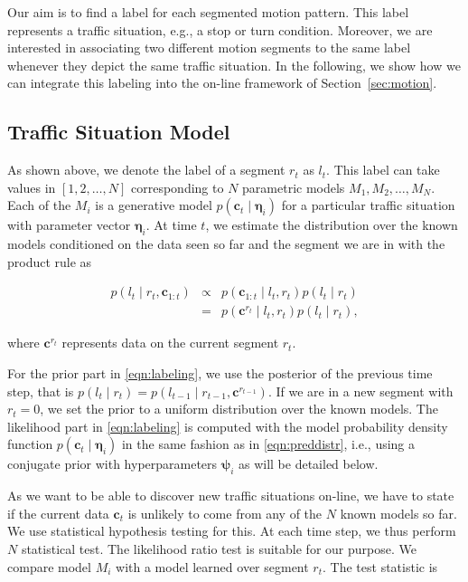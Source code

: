 Our aim is to find a label for each segmented motion pattern. This label
represents a traffic situation, e.g., a stop or turn condition. Moreover, we are
interested in associating two different motion segments to the same label
whenever they depict the same traffic situation. In the following, we show how
we can integrate this labeling into the on-line framework of
Section~\ref{sec:motion}.

\subsection{Traffic Situation Model}
As shown above, we denote the label of a segment $r_t$ as $l_t$. This label can
take values in $[1,2,\dots,N]$ corresponding to $N$ parametric models $M_1,M_2,
\dots,M_N$. Each of the $M_i$ is a generative model $p(\mathbf{c}_t\mid
\boldsymbol{\eta}_i)$ for a particular traffic situation with parameter vector
$\boldsymbol{\eta}_i$. At time $t$, we estimate the distribution over the known
models conditioned on the data seen so far and the segment we are in with the
product rule as

\begin{eqnarray}
\label{eqn:labeling}
p(l_t\mid r_t,\mathbf{c}_{1:t})&\propto&p(\mathbf{c}_{1:t}\mid l_t,r_t)
p(l_t\mid r_t)\nonumber\\
&=& p(\mathbf{c}^{r_t}\mid l_t,r_t)p(l_t\mid r_t),
\end{eqnarray}

where $\mathbf{c}^{r_t}$ represents data on the current segment $r_t$.

For the prior part in \eqref{eqn:labeling}, we use the posterior of the previous
time step, that is
$p(l_t\mid r_t)=p(l_{t-1}\mid r_{t-1},\mathbf{c}^{r_{t-1}})$. If we are in a new
segment with $r_t=0$, we set the prior to a uniform distribution over the known
models. The likelihood part in \eqref{eqn:labeling} is computed with the model
probability density function $p(\mathbf{c}_t\mid \boldsymbol{\eta}_i)$ in the
same fashion as in \eqref{eqn:preddistr}, i.e., using a conjugate prior with
hyperparameters $\boldsymbol{\psi}_i$ as will be detailed below.

As we want to be able to discover new traffic situations on-line, we have to
state if the current data $\mathbf{c}_t$ is unlikely to come from any of the
$N$ known models so far. We use statistical hypothesis testing for this. At each
time step, we thus perform $N$ statistical test. The likelihood ratio test is
suitable for our purpose. We compare model $M_i$ with a model learned over
segment $r_t$. The test statistic is

